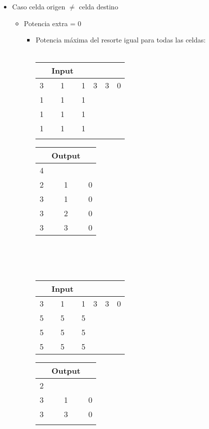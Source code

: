 \documentclass[11pt, a4paper, twoside]{article}
\begin{document}
\begin{itemize}
\item Caso celda origen $\ne$ celda destino 
	\begin{itemize}
		\item Potencia extra = 0 \\
			\begin{itemize}
				\item Potencia máxima del resorte igual para todas las celdas: \\
				\\
					\begin{minipage}{0.4\textwidth}
							\begin{tabular}{cccccc}
							 & Input \\
							   \hline
							   3 & 1 & 1 & 3 & 3 & 0\\
							   1 & 1 & 1 &   &   &  \\
							   1 & 1 & 1 &   &   &  \\
							   1 & 1 & 1 &   &   &  \\
							   \\
							\end{tabular}
						\end{minipage} 
							\begin{minipage}{0.3\textwidth}
								\begin{tabular}{ccc}
								  & Output \\
								   \hline
								   4 &   &   \\
								   2 & 1 & 0 \\
								   3 & 1 & 0 \\
								   3 & 2 & 0 \\
								   3 & 3 & 0 \\
							\end{tabular}
					\end{minipage} 	\\
					\\ \\
					\begin{minipage}{0.4\textwidth}
							\begin{tabular}{cccccc}
							   & Input  \\
							   \hline
							   3 & 1 & 1 & 3 & 3 & 0\\
							   5 & 5 & 5 &   &   &  \\
							   5 & 5 & 5 &   &   &  \\
							   5 & 5 & 5 &   &   &  \\
							\end{tabular}
					\end{minipage} 
					\begin{minipage}{0.3\textwidth}
							\begin{tabular}{ccc}
								   & Output \\
								   \hline
								   2 &   &   \\
								   3 & 1 & 0 \\
								   3 & 3 & 0 \\
								   \\
							\end{tabular}
					\end{minipage} 	\\


\end{itemize}
\end{itemize}
\end{itemize}
\end{document}
